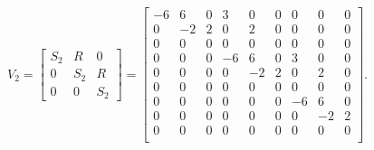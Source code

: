 \documentclass[hidelinks,11pt]{article}
\begin{document}
    \begin{equation*}
        V_2 = \begin{bmatrix}
                  S_2 & R & 0 \\ 0 & S_2 & R \\ 0 & 0 & S_2
        \end{bmatrix} = \left [
            \begin{array}{ccc|ccc|ccc}
                -6 & 6  & 0 & 3  & 0  & 0 & 0  & 0  & 0 \\
                0  & -2 & 2 & 0  & 2  & 0 & 0  & 0  & 0 \\
                0  & 0  & 0 & 0  & 0  & 0 & 0  & 0  & 0 \\
                \hline
                0  & 0  & 0 & -6 & 6  & 0 & 3  & 0  & 0 \\
                0  & 0  & 0 & 0  & -2 & 2 & 0  & 2  & 0 \\
                0  & 0  & 0 & 0  & 0  & 0 & 0  & 0  & 0 \\
                \hline
                0  & 0  & 0 & 0  & 0  & 0 & -6 & 6  & 0 \\
                0  & 0  & 0 & 0  & 0  & 0 & 0  & -2 & 2 \\
                0  & 0  & 0 & 0  & 0  & 0 & 0  & 0  & 0 \\
            \end{array}
            \right ].
    \end{equation*}
\end{document}
